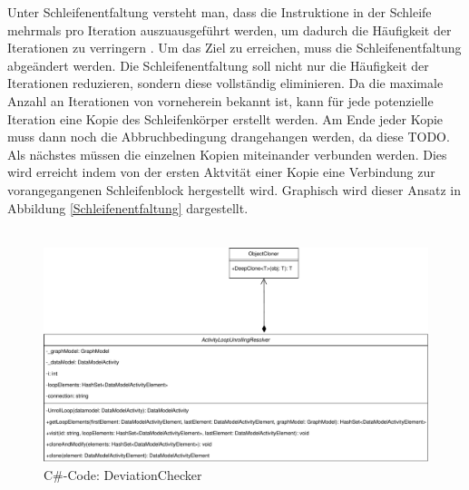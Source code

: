     Unter Schleifenentfaltung versteht man, dass die Instruktione in der Schleife mehrmals pro Iteration auszuausgeführt werden, um dadurch die Häufigkeit der Iterationen zu verringern \cite{9}.
    Um das Ziel zu erreichen, muss die Schleifenentfaltung abgeändert werden.
    Die Schleifenentfaltung soll nicht nur die Häufigkeit der Iterationen reduzieren, sondern diese vollständig eliminieren.
    Da die maximale Anzahl an Iterationen von vorneherein bekannt ist, kann für jede potenzielle Iteration eine Kopie des Schleifenkörper erstellt werden. 
    Am Ende jeder Kopie muss dann noch die Abbruchbedingung drangehangen werden, da diese TODO.
    Als nächstes müssen die einzelnen Kopien miteinander verbunden werden.
    Dies wird erreicht indem von der ersten Aktvität einer Kopie eine Verbindung zur vorangegangenen Schleifenblock hergestellt wird.
    Graphisch wird dieser Ansatz in Abbildung \ref{Schleifenentfaltung} dargestellt.\\
    \\
    \begin{figure}[H]
        \centering    
        \includegraphics[width=\textwidth]{./images/UnbenanntesDiagramm.pdf}
        \caption{C\#-Code: DeviationChecker}
    \end{figure}
